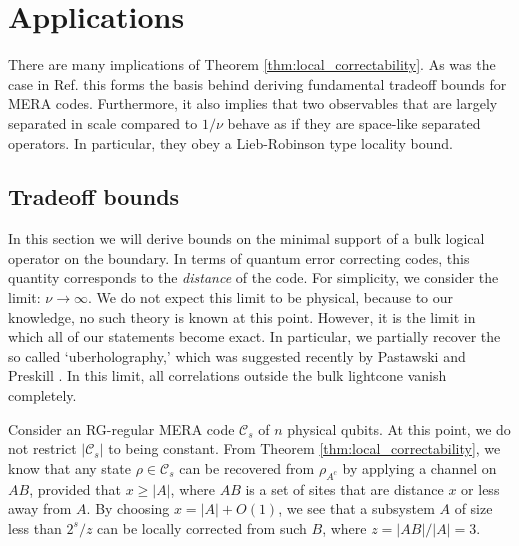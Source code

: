 \documentclass[a4paper,11pt]{article}
\newcommand{\1}{\mathbbm{1}}
\newcommand{\cC}{\mathcal{C}}
\begin{document}
\section{Applications\label{section:applications}}
There are many implications of Theorem \ref{thm:local_correctability}. As was the case in Ref. \cite{Flammia2016} this forms the basis behind deriving fundamental tradeoff bounds for MERA codes. Furthermore, it also implies that two observables that are largely separated in scale compared to $1/\nu$ behave as if they are space-like separated operators. In particular, they obey a Lieb-Robinson type locality bound.

\subsection{Tradeoff bounds}

In this section we will derive bounds on the minimal support of a bulk logical operator on the boundary. In terms of quantum error correcting codes, this quantity corresponds to the \textit{distance} of the code.
For simplicity, we consider the  limit: $\nu \to \infty$. We do not expect this limit to be physical, because to our knowledge, no such theory is known at this point. However, it is the limit in which all of our statements become exact. In particular, we partially recover the so called `uberholography,' which was suggested recently by Pastawski and Preskill \cite{Pastawski2016a}. In this limit, all correlations outside the bulk lightcone vanish completely.

Consider an RG-regular MERA code $\cC_s$ of $n$ physical qubits. At this point, we do not restrict $|\cC_s|$ to being constant. From Theorem \ref{thm:local_correctability}, we know that  any state $\rho\in\cC_s$ can be recovered from $\rho_{A^c}$ by applying a channel on $AB$, provided that $x \geq |A|$, where $AB$ is a set of sites that are distance $x$ or less away from $A$. By choosing $x=|A|+O(1)$, we see that a subsystem $A$ of size less than $2^s/z$ can be locally corrected from such $B$, where $z= |AB|/|A|=3$.

\end{document}
